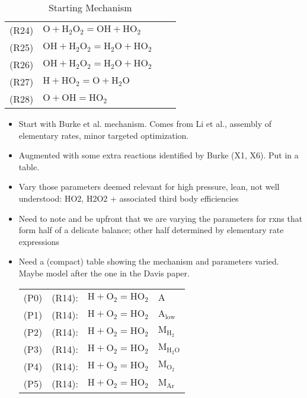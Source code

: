 \documentclass[preprint,3p,times,twocolumn]{elsarticle}
\begin{document}
\begin{table}[htp]
\begin{tabular}{l l l l}
(R24)&$ \mathrm{O} + \mathrm{H}_2\mathrm{O}_2 = \mathrm{OH} + \mathrm{HO}_2$\\
(R25)&$ \mathrm{OH} + \mathrm{H}_2\mathrm{O}_2 = \mathrm{H}_2\mathrm{O} + \mathrm{HO}_2$\\
(R26)&$ \mathrm{OH} + \mathrm{H}_2\mathrm{O}_2 = \mathrm{H}_2\mathrm{O} + \mathrm{HO}_2$\\
(R27)&$ \mathrm{H} + \mathrm{HO}_2 = \mathrm{O} + \mathrm{H}_2\mathrm{O}$\\
(R28)&$ \mathrm{O} + \mathrm{OH} = \mathrm{HO}_2$\\
\hline
  \end{tabular}
  \caption{Starting Mechanism}
  \label{tab:srcmech}
\end{table}
\begin{itemize}
\item Start with Burke et al. mechanism. Comes from Li et al.,
  assembly of elementary rates, minor targeted optimization.
\item Augmented with some extra reactions identified by Burke (X1,
  X6). Put in a table.
\item Vary those parameters deemed relevant for high pressure, lean,
  not well understood: HO2, H2O2 + associated third body efficiencies
\item Need to note and be upfront that we are varying the parameters
  for rxns that form half of a delicate balance; other half determined
  by elementary rate expressions
\item Need a (compact) table showing the mechanism and parameters
  varied. Maybe model after the one in the Davis paper.
  \begin{table}[htp]
    \centering
    \begin{tabular}{l r l l}
      \hline
 (P0)& (R14): & $ \mathrm{H} + \mathrm{O}_2 = \mathrm{HO}_2     $&$ \mathrm{A}$\\
 (P1)& (R14): & $ \mathrm{H} + \mathrm{O}_2 = \mathrm{HO}_2     $&$ \mathrm{A}_\mathrm{low}$\\
 (P2)& (R14): & $ \mathrm{H} + \mathrm{O}_2 = \mathrm{HO}_2     $&$ \mathrm{M}_{\mathrm{H}_2}$\\
 (P3)& (R14): & $ \mathrm{H} + \mathrm{O}_2 = \mathrm{HO}_2     $&$ \mathrm{M}_{\mathrm{H}_2\mathrm{O}}$\\
 (P4)& (R14): & $ \mathrm{H} + \mathrm{O}_2 = \mathrm{HO}_2     $&$ \mathrm{M}_{\mathrm{O}_2}$\\
 (P5)& (R14): & $ \mathrm{H} + \mathrm{O}_2 = \mathrm{HO}_2     $&$ \mathrm{M}_{\mathrm{Ar}}$\\

\end{tabular}
\end{table}
\end{itemize}
\end{document}
